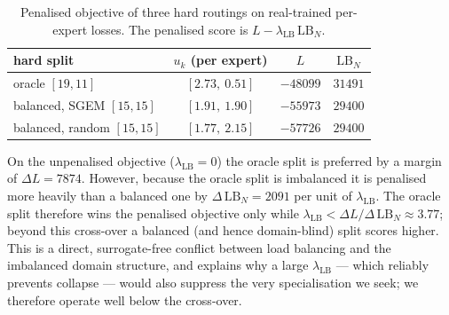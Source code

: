 \begin{table}[h]
\centering
\caption{Penalised objective of three hard routings on real-trained
per-expert losses. The penalised score is
$L - \lambda_{\text{LB}}\,\mathrm{LB}_N$.}
\label{tab:lambda}
\begin{tabular}{lccc}
\toprule
hard split & $u_k$ (per expert) & $L$ & $\mathrm{LB}_N$ \\
\midrule
oracle $[19, 11]$ & $[2.73,\ 0.51]$ & $-48099$ & $31491$ \\
balanced, SGEM $[15, 15]$ & $[1.91,\ 1.90]$ & $-55973$ & $29400$ \\
balanced, random $[15, 15]$ & $[1.77,\ 2.15]$ & $-57726$ & $29400$ \\
\bottomrule
\end{tabular}
\end{table}

On the unpenalised objective ($\lambda_{\text{LB}}=0$) the oracle split is
preferred by a margin of $\Delta L = 7874$. However, because the oracle
split is imbalanced it is penalised more heavily than a balanced one by
$\Delta\,\mathrm{LB}_N = 2091$ per unit of $\lambda_{\text{LB}}$. The
oracle split therefore wins the penalised objective only while
$\lambda_{\text{LB}} < \Delta L / \Delta\,\mathrm{LB}_N \approx 3.77$;
beyond this cross-over a balanced (and hence domain-blind) split scores
higher. This is a direct, surrogate-free conflict between load balancing
and the imbalanced domain structure, and explains why a large
$\lambda_{\text{LB}}$ --- which reliably prevents collapse --- would also
suppress the very specialisation we seek; we therefore operate well below
the cross-over.
